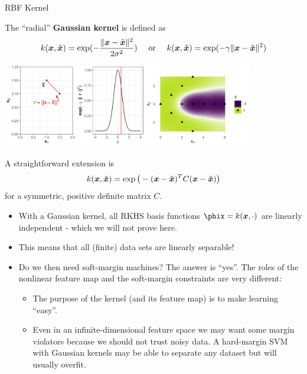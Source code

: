 \begin{vbframe}{RBF Kernel}

The \enquote{radial} \textbf{Gaussian kernel} is defined as
$$k(\bm{x}, \tilde {\bm{x}}) = \exp(-\frac{\|\bm{x} - \tilde {\bm{x}}\|^2}{2\sigma^2}) \quad \text{ or } \quad k(\bm{x}, \tilde {\bm{x}}) = \exp(-\gamma \|\bm{x} - \tilde {\bm{x}}\|^2)$$

\begin{center}
\includegraphics[width = 11cm ]{figure/svm_rbf_kernel.png}
\end{center}

A straightforward extension is
$$k(\bm{x},  \tilde {\bm{x}}) = \exp\big(- (\bm{x} -  \tilde {\bm{x}})^T C (\bm{x} -  \tilde {\bm{x}})\big)$$
for a symmetric, positive definite matrix $C$.

\framebreak

  \begin{itemize}

    \item With a Gaussian kernel, all RKHS basis functions 
      $\phix = k(\xv, \cdot)$ are linearly independent - which we will not prove here.
    \item This means that all (finite) data sets are linearly separable!
    \item Do we then need soft-margin machines? 
      The answer is \enquote{yes}. The roles of the nonlinear feature map and the
    soft-margin constraints are very different:
    \begin{itemize}
      \item The purpose of the kernel (and its feature map) is to make learning
      \enquote{easy}.
\item Even in an infinite-dimensional feature space we may want some
      margin violators because we should not trust noisy data. A hard-margin
      SVM with Gaussian kernels may be able to separate any dataset but will usually overfit.
    \end{itemize}
  \end{itemize}
\end{vbframe}

